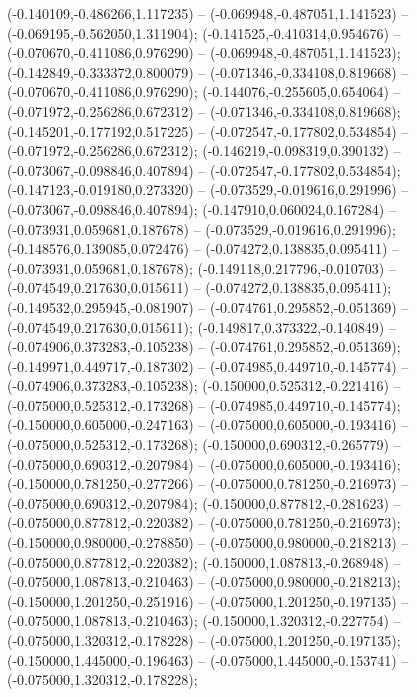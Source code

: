  (-0.140109,-0.486266,1.117235) -- (-0.069948,-0.487051,1.141523) -- (-0.069195,-0.562050,1.311904);
 (-0.141525,-0.410314,0.954676) -- (-0.070670,-0.411086,0.976290) -- (-0.069948,-0.487051,1.141523);
 (-0.142849,-0.333372,0.800079) -- (-0.071346,-0.334108,0.819668) -- (-0.070670,-0.411086,0.976290);
 (-0.144076,-0.255605,0.654064) -- (-0.071972,-0.256286,0.672312) -- (-0.071346,-0.334108,0.819668);
 (-0.145201,-0.177192,0.517225) -- (-0.072547,-0.177802,0.534854) -- (-0.071972,-0.256286,0.672312);
 (-0.146219,-0.098319,0.390132) -- (-0.073067,-0.098846,0.407894) -- (-0.072547,-0.177802,0.534854);
 (-0.147123,-0.019180,0.273320) -- (-0.073529,-0.019616,0.291996) -- (-0.073067,-0.098846,0.407894);
 (-0.147910,0.060024,0.167284) -- (-0.073931,0.059681,0.187678) -- (-0.073529,-0.019616,0.291996);
 (-0.148576,0.139085,0.072476) -- (-0.074272,0.138835,0.095411) -- (-0.073931,0.059681,0.187678);
 (-0.149118,0.217796,-0.010703) -- (-0.074549,0.217630,0.015611) -- (-0.074272,0.138835,0.095411);
 (-0.149532,0.295945,-0.081907) -- (-0.074761,0.295852,-0.051369) -- (-0.074549,0.217630,0.015611);
 (-0.149817,0.373322,-0.140849) -- (-0.074906,0.373283,-0.105238) -- (-0.074761,0.295852,-0.051369);
 (-0.149971,0.449717,-0.187302) -- (-0.074985,0.449710,-0.145774) -- (-0.074906,0.373283,-0.105238);
 (-0.150000,0.525312,-0.221416) -- (-0.075000,0.525312,-0.173268) -- (-0.074985,0.449710,-0.145774);
 (-0.150000,0.605000,-0.247163) -- (-0.075000,0.605000,-0.193416) -- (-0.075000,0.525312,-0.173268);
 (-0.150000,0.690312,-0.265779) -- (-0.075000,0.690312,-0.207984) -- (-0.075000,0.605000,-0.193416);
 (-0.150000,0.781250,-0.277266) -- (-0.075000,0.781250,-0.216973) -- (-0.075000,0.690312,-0.207984);
 (-0.150000,0.877812,-0.281623) -- (-0.075000,0.877812,-0.220382) -- (-0.075000,0.781250,-0.216973);
 (-0.150000,0.980000,-0.278850) -- (-0.075000,0.980000,-0.218213) -- (-0.075000,0.877812,-0.220382);
 (-0.150000,1.087813,-0.268948) -- (-0.075000,1.087813,-0.210463) -- (-0.075000,0.980000,-0.218213);
 (-0.150000,1.201250,-0.251916) -- (-0.075000,1.201250,-0.197135) -- (-0.075000,1.087813,-0.210463);
 (-0.150000,1.320312,-0.227754) -- (-0.075000,1.320312,-0.178228) -- (-0.075000,1.201250,-0.197135);
 (-0.150000,1.445000,-0.196463) -- (-0.075000,1.445000,-0.153741) -- (-0.075000,1.320312,-0.178228);
